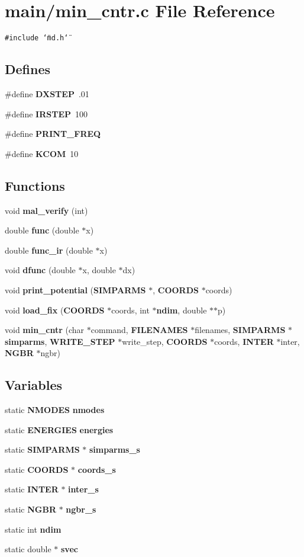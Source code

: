 \section{main/min\_\-cntr.c File Reference}
\label{min__cntr_8c}
{\tt \#include \char`\"{}md.h\char`\"{}}\par
\subsection*{Defines}
\begin{CompactItemize}
\item 
\#define {\bf DXSTEP}~.01
\item 
\#define {\bf IRSTEP}~100
\item 
\#define {\bf PRINT\_\-FREQ}
\item 
\#define {\bf KCOM}~10
\end{CompactItemize}
\subsection*{Functions}
\begin{CompactItemize}
\item 
void {\bf mal\_\-verify} (int)
\item 
double {\bf func} (double $\ast$x)
\item 
double {\bf func\_\-ir} (double $\ast$x)
\item 
void {\bf dfunc} (double $\ast$x, double $\ast$dx)
\item 
void {\bf print\_\-potential} ({\bf SIMPARMS} $\ast$, {\bf COORDS} $\ast$coords)
\item 
void {\bf load\_\-fix} ({\bf COORDS} $\ast$coords, int $\ast${\bf ndim}, double $\ast$$\ast$p)
\item 
void {\bf min\_\-cntr} (char $\ast$command, {\bf FILENAMES} $\ast$filenames, {\bf SIMPARMS} $\ast${\bf simparms}, {\bf WRITE\_\-STEP} $\ast$write\_\-step, {\bf COORDS} $\ast$coords, {\bf INTER} $\ast$inter, {\bf NGBR} $\ast$ngbr)
\end{CompactItemize}
\subsection*{Variables}
\begin{CompactItemize}
\item 
static {\bf NMODES} {\bf nmodes}
\item 
static {\bf ENERGIES} {\bf energies}
\item 
static {\bf SIMPARMS} $\ast$ {\bf simparms\_\-s}
\item 
static {\bf COORDS} $\ast$ {\bf coords\_\-s}
\item 
static {\bf INTER} $\ast$ {\bf inter\_\-s}
\item 
static {\bf NGBR} $\ast$ {\bf ngbr\_\-s}
\item 
static int {\bf ndim}
\item 
static double $\ast$ {\bf svec}
\end{CompactItemize}



